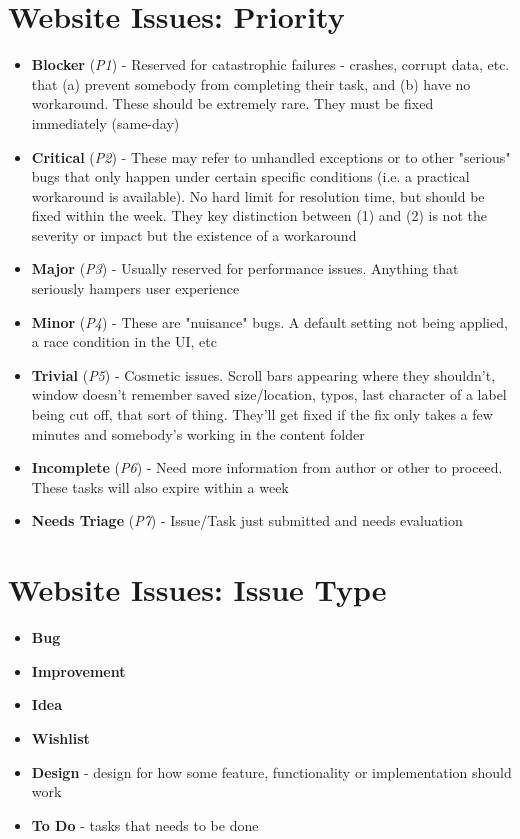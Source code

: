 \documentclass[10pt, oneside, letterpaper]{apa6e}
\begin{document}
\section{Website Issues: Priority}
\begin{itemize}
    \item \textbf{Blocker} (\textit{P1}) - Reserved for catastrophic failures -  crashes, corrupt data, etc. that (a) prevent somebody from completing their task, and (b) have no workaround. These should be extremely rare. They must be fixed immediately (same-day)
    \item  \textbf{Critical} (\textit{P2}) - These may refer to unhandled exceptions or to other "serious" bugs that only happen under certain specific conditions (i.e. a practical workaround is available). No hard limit for resolution time, but should be fixed within the week. They key distinction between (1) and (2) is not the severity or impact but the existence of a workaround
    \item \textbf{Major} (\textit{P3}) - Usually reserved for performance issues. Anything that seriously hampers user experience
    \item \textbf{Minor} (\textit{P4}) - These are "nuisance" bugs. A default setting not being applied, a race condition in the UI, etc
    \item \textbf{Trivial} (\textit{P5})  -  Cosmetic issues. Scroll bars appearing where they shouldn't, window doesn't remember saved size/location, typos, last character of a label being cut off, that sort of thing. They'll get fixed if the fix only takes a few minutes and somebody's working in the content folder
    \item \textbf{Incomplete} (\textit{P6})  -  Need more information from author or other to proceed. These tasks will also expire within a week 
    \item \textbf{Needs Triage} (\textit{P7}) - Issue/Task just submitted and needs evaluation
\end{itemize}
\newpage
\section{Website Issues: Issue Type}
\begin{itemize}
    \item \textbf{Bug}
    \item \textbf{Improvement}
    \item \textbf{Idea}
    \item \textbf{Wishlist}
    \item \textbf{Design} - design for how some feature, functionality or implementation should work 
    \item \textbf{To Do} -  tasks that needs to be done 
\end{itemize}
\newpage
\end{document}
